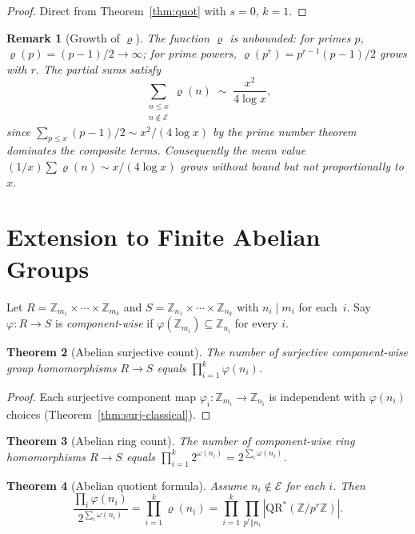 \documentclass[12pt]{amsart}
\theoremstyle{bluehead}
\newtheorem{theorem}{Theorem}[section]
\theoremstyle{orangehead}
\theoremstyle{greenhead}
\newtheorem{remark}[theorem]{Remark}
\newcommand{\Z}{\mathbb{Z}}
\newcommand{\QRS}{\mathrm{QR}^{*}}
\renewcommand{\phi}{\varphi}
\newcommand{\Exc}{\mathcal{E}}
\begin{document}
\begin{proof}
  Direct from Theorem~\ref{thm:quot} with $s=0$, $k=1$.
\qedhere
\end{proof}

\begin{remark}[Growth of $\varrho$]\label{rem:unbounded}
  The function $\varrho$ is unbounded: for primes $p$,
  $\varrho(p)=(p-1)/2\to\infty$; for prime powers,
  $\varrho(p^r)=p^{r-1}(p-1)/2$ grows with $r$.
  The partial sums satisfy
  \[
    \sum_{\substack{n\le x\\n\notin\Exc}}\!\varrho(n)
    \;\sim\;\frac{x^2}{4\log x},
  \]
  since $\sum_{p\le x}(p-1)/2\sim x^2/(4\log x)$ by the prime number
  theorem dominates the composite terms.  Consequently the mean value
  $(1/x)\sum\varrho(n)\sim x/(4\log x)$ grows without bound
  but not proportionally to $x$.
\end{remark}

\section{Extension to Finite Abelian Groups}\label{sec:abel}

Let $R=\Z_{m_1}\times\cdots\times\Z_{m_k}$ and
$S=\Z_{n_1}\times\cdots\times\Z_{n_k}$ with $n_i\mid m_i$ for each~$i$.
Say $\phi\colon R\to S$ is \emph{component-wise} if $\phi(\Z_{m_i})\subseteq\Z_{n_i}$
for every $i$.

\begin{theorem}[Abelian surjective count]\label{thm:abelian-surj}
  The number of surjective component-wise group homomorphisms
  $R\to S$ equals $\prod_{i=1}^k\phi(n_i)$.
\end{theorem}

\begin{proof}
  Each surjective component map $\phi_i\colon\Z_{m_i}\to\Z_{n_i}$ is
  independent with $\phi(n_i)$ choices (Theorem~\ref{thm:surj-classical}).
\qedhere
\end{proof}

\begin{theorem}[Abelian ring count]\label{thm:abelian-ring}
  The number of component-wise ring homomorphisms $R\to S$ equals
  $\prod_{i=1}^k 2^{\omega(n_i)}=2^{\sum_i\omega(n_i)}$.
\end{theorem}

\begin{theorem}[Abelian quotient formula]\label{thm:abelian}
  Assume $n_i\notin\Exc$ for each $i$.  Then
  \[
    \frac{\prod_i\phi(n_i)}{2^{\sum_i\omega(n_i)}}
    =\prod_{i=1}^k\varrho(n_i)
    =\prod_{i=1}^k\prod_{p^r\Vert n_i}|\QRS(\Z/p^r\Z)|.
  \]
\end{theorem}
\end{document}
